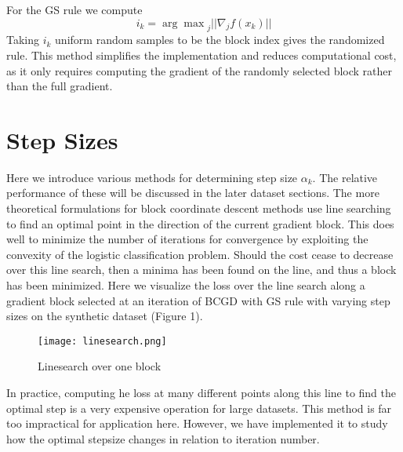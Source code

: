 \documentclass{article}
\begin{document}
For the GS rule we compute 
$$i_k = {\arg\max}_j ||\nabla_j f(x_k)||$$
Taking $i_k$ uniform random samples to be the block index gives the randomized rule. This method simplifies the implementation and reduces computational cost, as it only requires computing the gradient of the randomly selected block rather than the full gradient.

\section{Step Sizes}
Here we introduce various methods for determining step size $\alpha_k$. The relative performance of these will be discussed in the later dataset sections. 
The more theoretical formulations for block coordinate descent methods use line searching to find an optimal point in the direction of the current gradient block. This does well to minimize the number of iterations for convergence by exploiting the convexity of the logistic classification problem. Should the cost cease to decrease over this line search, then a minima has been found on the line, and thus a block has been minimized. Here we visualize the loss over the line search along a gradient block selected at an iteration of BCGD with GS rule with varying step sizes on the synthetic dataset (Figure 1).  
\begin{figure}
    \centering
    \texttt{[image: linesearch.png]}
    \caption{Linesearch over one block}
    \label{fig:linesearch}
\end{figure}
In practice, computing he loss at many different points along this line to find the optimal step is a very expensive operation for large datasets. This method is far too impractical for application here. However, we have implemented it to study how the optimal stepsize changes in relation to iteration number.
\end{document}
